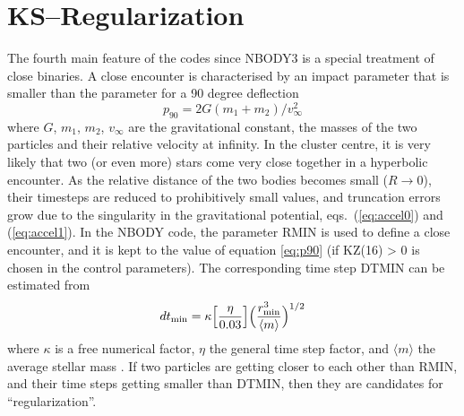 

\section{KS--Regularization} \label{ch:regularization}

The fourth main feature of the codes since NBODY3 is a special
treatment of close binaries.
A close encounter is characterised by an impact parameter
that is smaller than the parameter for a 90 degree deflection
%
\begin{equation}
p_{90} = 2 G(m_1 + m_2)/v_\infty^2   \label{eq:p90}
\end{equation}
%
where $G$, $m_1$, $m_2$, $v_\infty$ are the gravitational constant,
the masses of the two particles and their relative velocity
at infinity.
In the cluster centre, it is very likely that two (or even more)
stars come very close together in a hyperbolic encounter.
%
As the relative distance of the two bodies becomes small ($R \rightarrow 0$),
their timesteps are reduced to prohibitively small values, and
truncation errors grow due to the singularity in the gravitational
potential, eqs.~(\ref{eq:accel0}) and (\ref{eq:accel1}).
In the NBODY code, the parameter RMIN is used to define a close
encounter, and it is kept to the value of equation \ref{eq:p90}
(if KZ(16) > 0 is chosen in the control parameters).
The corresponding time step DTMIN can be estimated from 
%
\begin{equation}
dt_{\rm min} = \kappa \Bigl[{\eta \over 0.03}\Bigr]
       \Bigl({r_{\rm min}^3 \over \langle m \rangle }\Bigr)^{1/2}
          \label{eq:dtmin}
\end{equation}
%
where $\kappa$ is a free numerical factor,
$\eta$ the general time step factor,
and $\langle m \rangle$ the average stellar mass \cite{a_85}.
If two particles are getting closer to each other than RMIN, and
their time steps getting smaller than DTMIN, then they are candidates
for ``regularization''.

